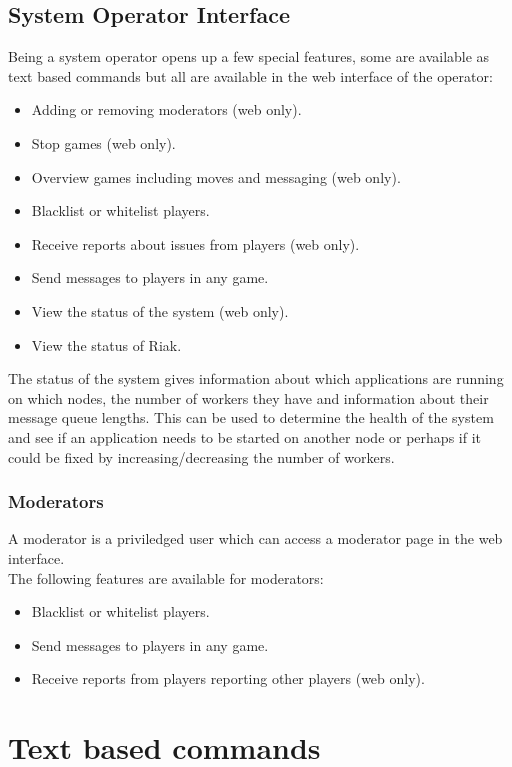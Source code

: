 \documentclass[11pt,a4paper]{report}
\begin{document}
\section{System Operator Interface}
Being a system operator opens up a few special features, some are available as
text based commands but all are available in the web interface of the operator:
\begin{itemize}
\item Adding or removing moderators (web only).
\item Stop games (web only).
\item Overview games including moves and messaging (web only).
\item Blacklist or whitelist players.
\item Receive reports about issues from players (web only).
\item Send messages to players in any game.
\item View the status of the system (web only).
\item View the status of Riak.
\end{itemize}

The status of the system gives information about which applications are running
on which nodes, the number of workers they have and information about their
message queue lengths. This can be used to determine the health of the system
and see if an application needs to be started on another node or perhaps if it
could be fixed by increasing/decreasing the number of workers.

\subsection{Moderators}
A moderator is a priviledged user which can access a moderator page in the web
interface.\\

The following features are available for moderators:
\begin{itemize}
\item Blacklist or whitelist players.
\item Send messages to players in any game.
\item Receive reports from players reporting other players (web only).
\end{itemize}

\chapter{Text based commands}
\label{sec:textbasedcommands}
\end{document}
